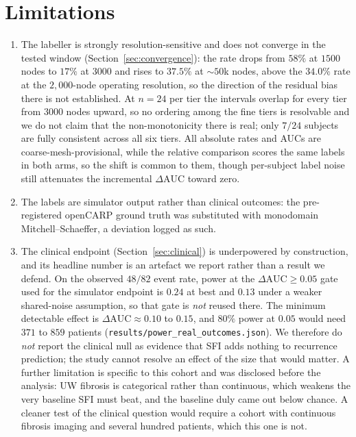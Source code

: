 \documentclass[11pt]{article}
\theoremstyle{definition}
\newcommand{\dAUC}{\Delta\mathrm{AUC}}
\newcommand{\code}[1]{\texttt{#1}}
\begin{document}
\section{Limitations}
\begin{enumerate}[leftmargin=1.5em]
\item The labeller is strongly resolution-sensitive and does not converge in the
tested window (Section~\ref{sec:convergence}):
the rate drops from $58\%$ at $1500$ nodes to $17\%$ at $3000$ and rises to
$37.5\%$ at $\sim\!50$k nodes, above the
$34.0\%$ rate at the $2{,}000$-node operating resolution, so the direction of the
residual bias there is not established. At $n=24$ per tier the intervals overlap
for every tier from $3000$ nodes upward, so no ordering among the fine tiers is
resolvable and we do not claim that the non-monotonicity there is real; only
$7/24$ subjects are fully consistent across all six tiers. All absolute rates and
AUCs are coarse-mesh-provisional, while the relative comparison scores the same
labels in both arms, so the shift is common to them, though per-subject label
noise still attenuates the incremental $\dAUC$ toward zero.
\item The labels are simulator output rather than clinical outcomes: the
pre-registered openCARP ground truth was substituted with monodomain
Mitchell--Schaeffer, a deviation logged as such.
\item The clinical endpoint (Section~\ref{sec:clinical}) is underpowered by
construction, and its headline number is an artefact we report rather than a
result we defend. On the observed $48/82$ event
rate, power at the $\dAUC\geq0.05$ gate used for the simulator endpoint is
$0.24$ at best and $0.13$ under a weaker shared-noise assumption, so that gate
is \emph{not} reused there. The minimum detectable effect is $\dAUC\approx0.10$
to $0.15$, and $80\%$ power at $0.05$ would need $371$ to $859$ patients
(\code{results/\allowbreak power\allowbreak\_real\allowbreak\_outcomes.json}).
We therefore do \emph{not} report the clinical null as evidence that SFI adds
nothing to recurrence prediction; the study cannot resolve an effect of the size
that would matter. A further limitation is specific to this cohort and was
disclosed before the analysis: UW fibrosis is categorical rather than continuous,
which weakens the very baseline SFI must beat, and the baseline duly came out
below chance. A cleaner test of the clinical question would require a cohort with
continuous fibrosis imaging and several hundred patients, which this one is not.

\end{enumerate}
\end{document}
